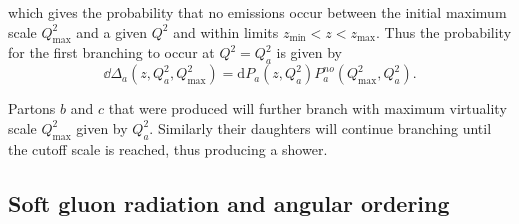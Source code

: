 \noindent which gives the probability that no emissions occur between the initial maximum scale $Q^2_\mathrm{max}$ and a given $Q^2$ and within limits $z_\mathrm{min} < z < z_\mathrm{max}$. Thus the probability for the first branching to occur at $Q^2=Q^2_a$ is given by 
\begin{equation}
\dd \Delta_a\left(z,Q_a^2,Q_\mathrm{max}^2\right)=\mathrm{d}P_a \left(z,Q^2_a\right) P_a^{no}\left(Q^2_\mathrm{max},Q_a^2\right).
\end{equation}

\noindent Partons $b$ and $c$ that were produced will further branch with maximum virtuality scale $Q^2_\mathrm{max}$ given by $Q^2_a$. Similarly their daughters will continue branching until the cutoff scale is reached, thus producing a shower. 





\subsection{Soft gluon radiation and angular ordering}

